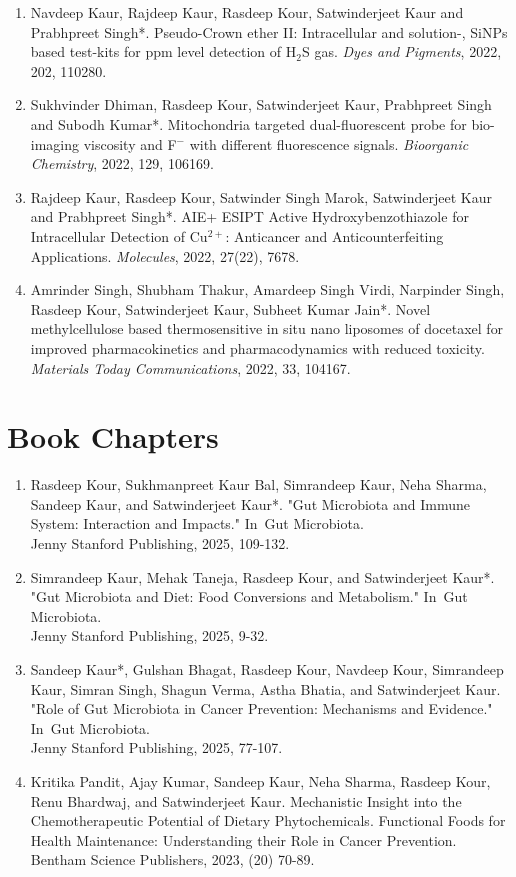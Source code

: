 \documentclass[11pt,a4paper]{article}
\begin{document}
\begin{enumerate}
  \item Navdeep Kaur, Rajdeep Kaur, Rasdeep Kour, Satwinderjeet Kaur and Prabhpreet Singh*. Pseudo-Crown ether II: Intracellular and solution-, SiNPs based test-kits for ppm level detection of H$_2$S gas. \textit{Dyes and Pigments}, 2022, 202, 110280.
  \item Sukhvinder Dhiman, Rasdeep Kour, Satwinderjeet Kaur, Prabhpreet Singh and Subodh Kumar*. Mitochondria targeted dual-fluorescent probe for bio-imaging viscosity and F$^-$ with different fluorescence signals. \textit{Bioorganic Chemistry}, 2022, 129, 106169.
  \item Rajdeep Kaur, Rasdeep Kour, Satwinder Singh Marok, Satwinderjeet Kaur and Prabhpreet Singh*. AIE+ ESIPT Active Hydroxybenzothiazole for Intracellular Detection of Cu$^{2+}$: Anticancer and Anticounterfeiting Applications. \textit{Molecules}, 2022, 27(22), 7678.
  \item Amrinder Singh, Shubham Thakur, Amardeep Singh Virdi, Narpinder Singh, Rasdeep Kour, Satwinderjeet Kaur, Subheet Kumar Jain*. Novel methylcellulose based thermosensitive in situ nano liposomes of docetaxel for improved pharmacokinetics and pharmacodynamics with reduced toxicity. \textit{Materials Today Communications}, 2022, 33, 104167.
\end{enumerate}

\vspace{0.5cm}

\section*{Book Chapters}
\begin{enumerate}
	\item Rasdeep Kour, Sukhmanpreet Kaur Bal, Simrandeep Kaur, Neha Sharma, Sandeep Kaur, and Satwinderjeet Kaur*. "Gut Microbiota and Immune System: Interaction and Impacts." In Gut Microbiota.\\
	Jenny Stanford Publishing, 2025, 109-132. 
	\item Simrandeep Kaur, Mehak Taneja, Rasdeep Kour, and Satwinderjeet Kaur*. "Gut Microbiota and Diet: Food Conversions and Metabolism." In Gut Microbiota.\\
	Jenny Stanford Publishing, 2025, 9-32.
	\item Sandeep Kaur*, Gulshan Bhagat, Rasdeep Kour, Navdeep Kour, Simrandeep Kaur, Simran Singh, Shagun Verma, Astha Bhatia, and Satwinderjeet Kaur. "Role of Gut Microbiota in Cancer Prevention: Mechanisms and Evidence." In Gut Microbiota.\\ 
	Jenny Stanford Publishing, 2025, 77-107.
	\item Kritika Pandit, Ajay Kumar, Sandeep Kaur, Neha Sharma, Rasdeep Kour, Renu Bhardwaj, and Satwinderjeet Kaur. Mechanistic Insight into the Chemotherapeutic Potential of Dietary Phytochemicals. Functional Foods for Health Maintenance: Understanding their Role in Cancer Prevention. \\
	Bentham Science Publishers, 2023, (20) 70-89.
\end{enumerate}
\end{document}
